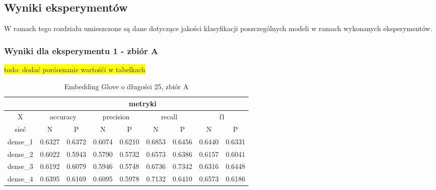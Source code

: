 \newpage %
\subsection{Wyniki eksperymentów} \label{wyniki_eksperymentow}

W ramach tego rozdziału umieszczone są dane dotyczące jakości klasyfikacji poszczególnych modeli w ramach wykonanych eksperymentów.

\subsubsection{Wyniki dla eksperymentu 1 - zbiór A}

\colorbox{yellow}{todo: dodać poróœnanie wartośći w tabelkach}

\begin{table}[h] \centering
    \caption{Embedding Glove o długości 25, zbiór A}
    \label{tab:wyniki_glove_A}
    \begin{tabular} {|c|c|c|c|c|c|c|c|c| }    \hline
                 & \multicolumn{8}{c|}{metryki}                                                                                                                               \\ \hline
        X        & \multicolumn{2}{c|}{accuracy} & \multicolumn{2}{c|}{precision} & \multicolumn{2}{c|}{recall} & \multicolumn{2}{c|}{f1}                                     \\ \hline
        sieć     & N                             & P                              & N                           & P                       & N      & P      & N      & P      \\ \hline
        dense\_1 & 0.6327                        & 0.6372                         & 0.6074                      & 0.6210                  & 0.6853 & 0.6456 & 0.6440 & 0.6331 \\ \hline
        dense\_2 & 0.6022                        & 0.5943                         & 0.5790                      & 0.5732                  & 0.6573 & 0.6386 & 0.6157 & 0.6041 \\ \hline
        dense\_3 & 0.6192                        & 0.6079                         & 0.5946                      & 0.5748                  & 0.6736 & 0.7342 & 0.6316 & 0.6448 \\ \hline
        dense\_4 & 0.6395                        & 0.6169                         & 0.6095                      & 0.5978                  & 0.7132 & 0.6410 & 0.6573 & 0.6186 \\ \hline

\end{tabular}
\end{table}
